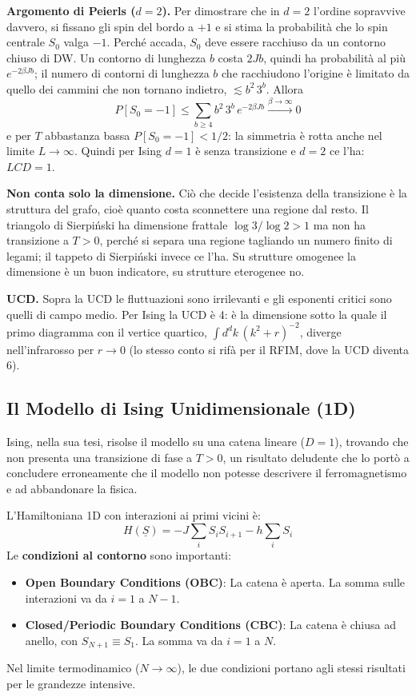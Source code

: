 \noindent\textbf{Argomento di Peierls ($d=2$).} Per dimostrare che in $d=2$ l'ordine sopravvive davvero, si fissano gli spin del bordo a $+1$ e si stima la probabilità che lo spin centrale $S_0$ valga $-1$. Perché accada, $S_0$ deve essere racchiuso da un contorno chiuso di DW. Un contorno di lunghezza $b$ costa $2Jb$, quindi ha probabilità al più $e^{-2\beta J b}$; il numero di contorni di lunghezza $b$ che racchiudono l'origine è limitato da quello dei cammini che non tornano indietro, $\lesssim b^2\, 3^{b}$. Allora
\begin{equation}
P[S_0 = -1] \le \sum_{b \ge 4} b^2\, 3^{b}\, e^{-2\beta J b} \xrightarrow{\beta \to \infty} 0
\end{equation}
e per $T$ abbastanza bassa $P[S_0=-1] < 1/2$: la simmetria è rotta anche nel limite $L \to \infty$. Quindi per Ising $d=1$ è senza transizione e $d=2$ ce l'ha: $LCD = 1$.

\noindent\textbf{Non conta solo la dimensione.} Ciò che decide l'esistenza della transizione è la struttura del grafo, cioè quanto costa sconnettere una regione dal resto. Il triangolo di Sierpiński ha dimensione frattale $\log 3/\log 2 > 1$ ma non ha transizione a $T>0$, perché si separa una regione tagliando un numero finito di legami; il tappeto di Sierpiński invece ce l'ha. Su strutture omogenee la dimensione è un buon indicatore, su strutture eterogenee no.

\noindent\textbf{UCD.} Sopra la UCD le fluttuazioni sono irrilevanti e gli esponenti critici sono quelli di campo medio. Per Ising la UCD è 4: è la dimensione sotto la quale il primo diagramma con il vertice quartico, $\int d^d k \, (k^2+r)^{-2}$, diverge nell'infrarosso per $r \to 0$ (lo stesso conto si rifà per il RFIM, dove la UCD diventa 6).

\subsection{Il Modello di Ising Unidimensionale (1D)}

Ising, nella sua tesi, risolse il modello su una catena lineare ($D=1$), trovando che non presenta una transizione di fase a $T>0$, un risultato deludente che lo portò a concludere erroneamente che il modello non potesse descrivere il ferromagnetismo e ad abbandonare la fisica.

L'Hamiltoniana 1D con interazioni ai primi vicini è:
\begin{equation}
H(\underline{S}) = -J \sum_{i} S_i S_{i+1} - h \sum_i S_i
\end{equation}
Le \textbf{condizioni al contorno} sono importanti:
\begin{itemize}
    \item \textbf{Open Boundary Conditions (OBC)}: La catena è aperta. La somma sulle interazioni va da $i=1$ a $N-1$.
    \item \textbf{Closed/Periodic Boundary Conditions (CBC)}: La catena è chiusa ad anello, con $S_{N+1} \equiv S_1$. La somma va da $i=1$ a $N$.
\end{itemize}
Nel limite termodinamico ($N \to \infty$), le due condizioni portano agli stessi risultati per le grandezze intensive.

